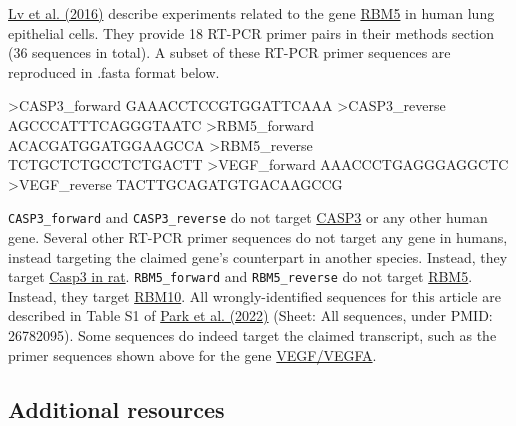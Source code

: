 \documentclass[letterpaper, 12pt]{article}
\begin{document}
\href{https://doi.org/10.3892/or.2016.4551}{Lv et al. (2016)} describe experiments related to the gene \href{https://www.ncbi.nlm.nih.gov/gene/10181}{RBM5} in human lung epithelial cells. They provide 18 RT-PCR primer pairs in their methods section (36 sequences in total). A subset of these RT-PCR primer sequences are reproduced in .fasta format below.

\begin{verbatim*}
>CASP3_forward
GAAACCTCCGTGGATTCAAA
>CASP3_reverse
AGCCCATTTCAGGGTAATC
>RBM5_forward
ACACGATGGATGGAAGCCA
>RBM5_reverse
TCTGCTCTGCCTCTGACTT
>VEGF_forward
AAACCCTGAGGGAGGCTC
>VEGF_reverse
TACTTGCAGATGTGACAAGCCG
\end{verbatim*}

\verb|CASP3_forward| and \verb|CASP3_reverse| do not target \href{https://www.ncbi.nlm.nih.gov/gene/836}{CASP3} or any other human gene. Several other RT-PCR primer sequences do not target any gene in humans, instead targeting the claimed gene's counterpart in another species. Instead, they target \href{https://www.ncbi.nlm.nih.gov/gene/25402}{Casp3 in rat}. \verb|RBM5_forward| and \verb|RBM5_reverse| do not target \href{https://www.ncbi.nlm.nih.gov/gene/10181}{RBM5}. Instead, they target \href{https://www.ncbi.nlm.nih.gov/gene/8241}{RBM10}. All wrongly-identified sequences for this article are described in Table S1 of \href{https://doi.org/10.26508/lsa.202101203}{Park et al. (2022)} (Sheet: All sequences, under PMID: 26782095). Some sequences do indeed target the claimed transcript, such as the primer sequences shown above for the gene \href{https://www.ncbi.nlm.nih.gov/gene/7422}{VEGF/VEGFA}.

\subsection*{Additional resources}
\end{document}
